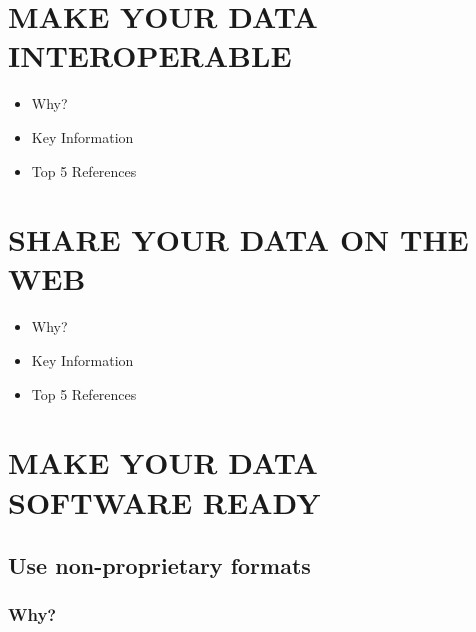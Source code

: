 \documentclass[
  oneside]{book}
\providecommand{\tightlist}{%
  \setlength{\itemsep}{0pt}\setlength{\parskip}{0pt}}
\begin{document}
\hypertarget{make-your-data-interoperable}{%
\chapter{MAKE YOUR DATA INTEROPERABLE}\label{make-your-data-interoperable}}

\begin{itemize}
\tightlist
\item
  Why?
\item
  Key Information
\item
  Top 5 References
\end{itemize}

\hypertarget{share-your-data-on-the-web}{%
\chapter{SHARE YOUR DATA ON THE WEB}\label{share-your-data-on-the-web}}

\begin{itemize}
\tightlist
\item
  Why?
\item
  Key Information
\item
  Top 5 References
\end{itemize}

\hypertarget{make-your-data-software-ready}{%
\chapter{MAKE YOUR DATA SOFTWARE READY}\label{make-your-data-software-ready}}

\hypertarget{use-non-proprietary-formats}{%
\section{Use non-proprietary formats}\label{use-non-proprietary-formats}}

\hypertarget{why}{%
\subsection{Why?}\label{why}}
\end{document}
